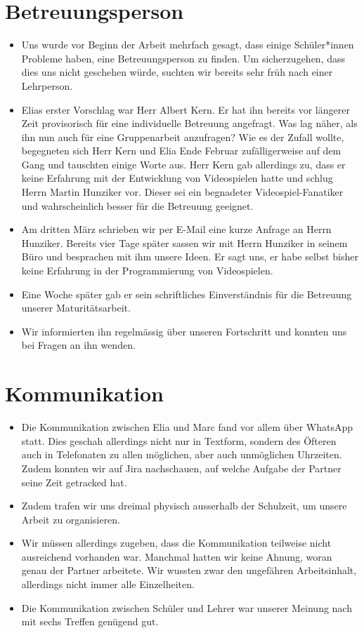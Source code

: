 \section{Betreuungsperson}
\begin{itemize}
    \item Uns wurde vor Beginn der Arbeit mehrfach gesagt, dass einige Schüler*innen Probleme haben, eine Betreuungsperson zu finden. Um sicherzugehen, dass dies uns nicht geschehen würde, suchten wir bereits sehr früh nach einer Lehrperson.
    \item Elias erster Vorschlag war Herr Albert Kern. Er hat ihn bereits vor längerer Zeit provisorisch für eine individuelle Betreuung angefragt. Was lag näher, als ihn nun auch für eine Gruppenarbeit anzufragen? Wie es der Zufall wollte, begegneten sich 
    Herr Kern und Elia Ende Februar zufälligerweise auf dem Gang und tauschten einige Worte aus. Herr Kern gab allerdings zu, dass er keine Erfahrung mit der Entwicklung von Videospielen hatte und schlug Herrn Martin Hunziker vor.
    Dieser sei ein begnadeter Videospiel-Fanatiker und wahrscheinlich besser für die Betreuung geeignet. 
    \item Am dritten März schrieben wir per E-Mail eine kurze Anfrage an Herrn Hunziker. 
    Bereits vier Tage später sassen wir mit Herrn Hunziker in seinem Büro und besprachen mit ihm unsere Ideen. Er sagt uns, er habe selbst bisher keine Erfahrung in der Programmierung von Videospielen.
    \item Eine Woche später gab er sein schriftliches Einverständnis für die Betreuung unserer Maturitätsarbeit. 
    \item Wir informierten ihn regelmässig über unseren Fortschritt und konnten uns bei Fragen an ihn wenden.
\end{itemize}

\section{Kommunikation}
\begin{itemize}
    \item Die Kommunikation zwischen Elia und Marc fand vor allem über WhatsApp statt. Dies geschah allerdings nicht nur in Textform, sondern des Öfteren auch in Telefonaten zu allen möglichen, aber auch unmöglichen Uhrzeiten. Zudem konnten wir auf Jira nachschauen, auf welche Aufgabe der Partner
    seine Zeit getracked hat. 
    \item Zudem trafen wir uns dreimal physisch ausserhalb der Schulzeit, um unsere Arbeit zu organisieren.
    \item Wir müssen allerdings zugeben, dass die Kommunikation teilweise nicht ausreichend vorhanden war. Manchmal hatten wir keine Ahnung, woran genau der Partner arbeitete. Wir wussten zwar den ungefähren Arbeitsinhalt, allerdings nicht immer alle Einzelheiten.
    \item Die Kommunikation zwischen Schüler und Lehrer war unserer Meinung nach mit sechs Treffen genügend gut.
\end{itemize}



